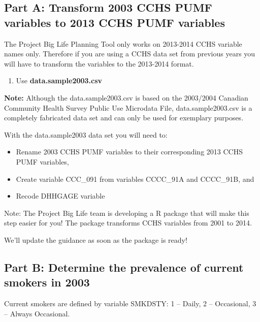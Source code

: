 \documentclass[]{book}
\providecommand{\tightlist}{%
  \setlength{\itemsep}{0pt}\setlength{\parskip}{0pt}}
\begin{document}
\hypertarget{part-a-transform-2003-cchs-pumf-variables-to-2013-cchs-pumf-variables}{%
\subsection{Part A: Transform 2003 CCHS PUMF variables to 2013 CCHS PUMF variables}\label{part-a-transform-2003-cchs-pumf-variables-to-2013-cchs-pumf-variables}}

The Project Big Life Planning Tool only works on 2013-2014 CCHS variable names only. Therefore if you are using a CCHS data set from previous years you will have to transform the variables to the 2013-2014 format.

\begin{enumerate}
\def\labelenumi{\arabic{enumi}.}
\tightlist
\item
  Use \textbf{data.sample2003.csv}
\end{enumerate}

\textbf{Note:} Although the data.sample2003.csv is based on the 2003/2004 Canadian Community Health Survey Public Use Microdata File, data.sample2003.csv is a completely fabricated data set and can only be used for exemplary purposes.

With the data.sample2003 data set you will need to:

\begin{itemize}
\item
  Rename 2003 CCHS PUMF variables to their corresponding 2013 CCHS PUMF variables,
\item
  Create variable CCC\_091 from variables CCCC\_91A and CCCC\_91B, and
\item
  Recode DHHGAGE variable
\end{itemize}

Note: The Project Big Life team is developing a R package that will make this step easier for you! The package transforms CCHS variables from 2001 to 2014.

We'll update the guidance as soon as the package is ready!

\hypertarget{part-b-determine-the-prevalence-of-current-smokers-in-2003}{%
\subsection{Part B: Determine the prevalence of current smokers in 2003}\label{part-b-determine-the-prevalence-of-current-smokers-in-2003}}

Current smokers are defined by variable SMKDSTY: 1 -- Daily, 2 -- Occasional, 3 -- Always Occasional.
\end{document}

